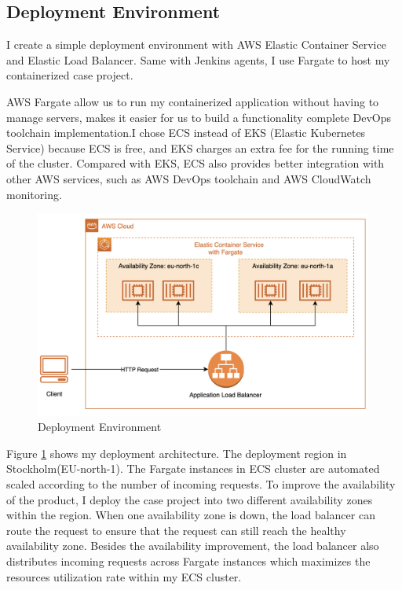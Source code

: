 \subsection{Deployment Environment}
I create a simple deployment environment with AWS Elastic Container Service and Elastic Load Balancer. Same with Jenkins agents, I use Fargate to host my containerized case project. 
\par
AWS Fargate allow us to run my containerized application without having to manage servers, makes it easier for us to build a functionality complete DevOps toolchain implementation.I chose ECS instead of EKS (Elastic Kubernetes Service) because ECS is free, and EKS charges an extra fee for the running time of the cluster. Compared with EKS, ECS also provides better integration with other AWS services, such as AWS DevOps toolchain and AWS CloudWatch monitoring.
\begin{figure}[h]
     \centering
     \includegraphics[width=0.99\textwidth]{pics/deploy.png}
     \caption{Deployment Environment}
     \label{fig:deploy}
\end{figure}
\par
Figure \ref{fig:deploy} shows my deployment architecture. The deployment region in Stockholm(EU-north-1). The Fargate instances in ECS cluster are automated scaled according to the number of incoming requests.
To improve the availability of the product, I deploy the case project into two different availability zones within the region.
When one availability zone is down, the load balancer can route the request to ensure that the request can still reach the healthy availability zone. Besides the availability improvement, the load balancer also distributes incoming requests across Fargate instances which maximizes the resources utilization rate within my ECS cluster.
